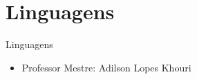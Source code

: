\section{Linguagens}

\begin{frame}	
	\begin{block}{Linguagens}	
		\begin{itemize}
			\item Professor Mestre: Adilson Lopes Khouri
		\end{itemize}		
	\end{block}
\end{frame}

